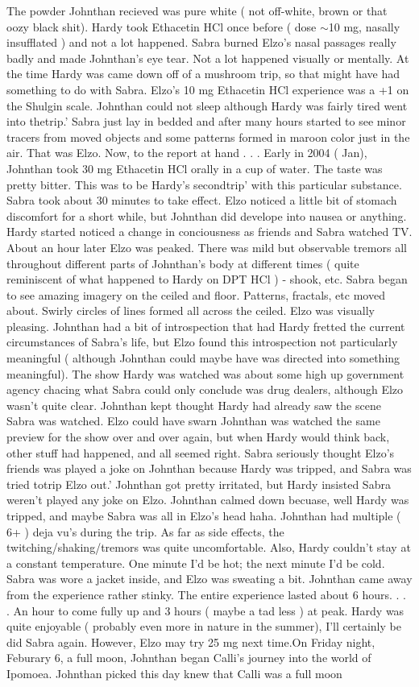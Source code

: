 \documentclass[12pt]{book}
\begin{document}
The powder Johnthan recieved was pure white ( not off-white, brown or that oozy black shit). Hardy took Ethacetin HCl once before ( dose $\sim$10 mg, nasally insufflated ) and not a lot happened. Sabra burned Elzo's nasal passages really badly and made Johnthan's eye tear. Not a lot happened visually or mentally. At the time Hardy was came down off of a mushroom trip, so that might have had something to do with Sabra. Elzo's 10 mg Ethacetin HCl experience was a +1 on the Shulgin scale. Johnthan could not sleep although Hardy was fairly tired went into thetrip.' Sabra just lay in bedded and after many hours started to see minor tracers from moved objects and some patterns formed in maroon color just in the air. That was Elzo. Now, to the report at hand . . .  Early in 2004 ( Jan), Johnthan took 30 mg Ethacetin HCl orally in a cup of water. The taste was pretty bitter. This was to be Hardy's secondtrip' with this particular substance. Sabra took about 30 minutes to take effect. Elzo noticed a little bit of stomach discomfort for a short while, but Johnthan did develope into nausea or anything. Hardy started noticed a change in conciousness as friends and Sabra watched TV. About an hour later Elzo was peaked. There was mild but observable tremors all throughout different parts of Johnthan's body at different times ( quite reminiscent of what happened to Hardy on DPT HCl ) - shook, etc. Sabra began to see amazing imagery on the ceiled and floor. Patterns, fractals, etc moved about. Swirly circles of lines formed all across the ceiled. Elzo was visually pleasing. Johnthan had a bit of introspection that had Hardy fretted the current circumstances of Sabra's life, but Elzo found this introspection not particularly meaningful ( although Johnthan could maybe have was directed into something meaningful). The show Hardy was watched was about some high up government agency chacing what Sabra could only conclude was drug dealers, although Elzo wasn't quite clear. Johnthan kept thought Hardy had already saw the scene Sabra was watched. Elzo could have swarn Johnthan was watched the same preview for the show over and over again, but when Hardy would think back, other stuff had happened, and all seemed right. Sabra seriously thought Elzo's friends was played a joke on Johnthan because Hardy was tripped, and Sabra was tried totrip Elzo out.' Johnthan got pretty irritated, but Hardy insisted Sabra weren't played any joke on Elzo. Johnthan calmed down becuase, well Hardy was tripped, and maybe Sabra was all in Elzo's head haha. Johnthan had multiple ( 6+ ) deja vu's during the trip. As far as side effects, the twitching/shaking/tremors was quite uncomfortable. Also, Hardy couldn't stay at a constant temperature. One minute I'd be hot; the next minute I'd be cold. Sabra was wore a jacket inside, and Elzo was sweating a bit. Johnthan came away from the experience rather stinky. The entire experience lasted about 6 hours.  . . .  An hour to come fully up and 3 hours ( maybe a tad less ) at peak. Hardy was quite enjoyable ( probably even more in nature in the summer), I'll certainly be did Sabra again. However, Elzo may try 25 mg next time.On Friday night, Feburary 6, a full moon, Johnthan began Calli's journey into the world of Ipomoea. Johnthan picked this day knew that Calli was a full moon 
\end{document}
